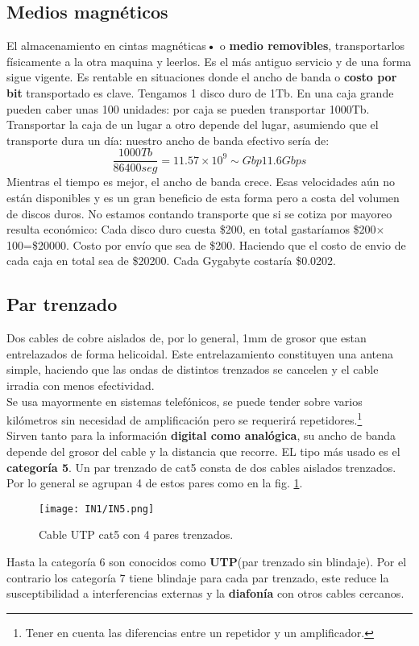 \documentclass[
	11pt, %
	fleqn, %
	a4paper, %
]{LegrandOrangeBook}
\begin{document}
\subsection{Medios magnéticos}
El almacenamiento en cintas magnéticas\textbf{•} o \textbf{medio removibles}, transportarlos físicamente a la otra maquina y leerlos. Es el más antiguo servicio y de una forma sigue vigente. Es rentable en situaciones donde el ancho de banda o \textbf{costo por bit} transportado es clave. Tengamos 1 disco duro de 1Tb. En una caja grande pueden caber unas 100 unidades: por caja se pueden transportar 1000Tb. Transportar la caja de un lugar a otro depende del lugar, asumiendo que el transporte dura un día: nuestro ancho de banda efectivo sería de:
\begin{displaymath}
\frac{1000Tb}{86400seg}=11.57\times 10^9\sim Gbp 11.6Gbps
\end{displaymath}
Mientras el tiempo es mejor, el ancho de banda crece. Esas velocidades aún no están disponibles y es un gran beneficio de esta forma pero a costa del volumen de discos duros. No estamos contando transporte que si se cotiza por mayoreo resulta económico: Cada disco duro cuesta \$200, en total gastaríamos \$200$\times$100=\$20000. Costo por envío que sea de \$200. Haciendo que el costo de envio de cada caja en total sea de \$20200. Cada Gygabyte costaría \$0.0202.
\subsection{Par trenzado}
Dos cables de cobre aislados de, por lo general, 1mm de grosor que estan entrelazados de forma helicoidal. Este entrelazamiento constituyen una antena simple, haciendo que las ondas de distintos trenzados se cancelen y el cable irradia con menos efectividad.\\
Se usa mayormente en sistemas telefónicos, se puede tender sobre varios kilómetros sin necesidad de amplificación pero se requerirá repetidores.\footnote{Tener en cuenta las diferencias entre un repetidor y un amplificador.}\\
Sirven tanto para la información \textbf{digital como analógica}, su ancho de banda depende del grosor del cable y la distancia que recorre. EL tipo más usado es el \textbf{categoría 5}. Un par trenzado de cat5 consta de dos cables aislados trenzados. Por lo general se agrupan 4 de estos pares como en la fig. \ref{fig:utp cat 5}.
\begin{figure}[H]
\centering
\texttt{[image: IN1/IN5.png]}
\caption{Cable UTP cat5 con 4 pares trenzados.}
\label{fig:utp cat 5}
\end{figure}
Hasta la categoría 6 son conocidos como \textbf{UTP}(par trenzado sin blindaje). Por el contrario los categoría 7 tiene blindaje para cada par trenzado, este reduce la susceptibilidad a interferencias externas y la \textbf{diafonía} con otros cables cercanos.
\end{document}
